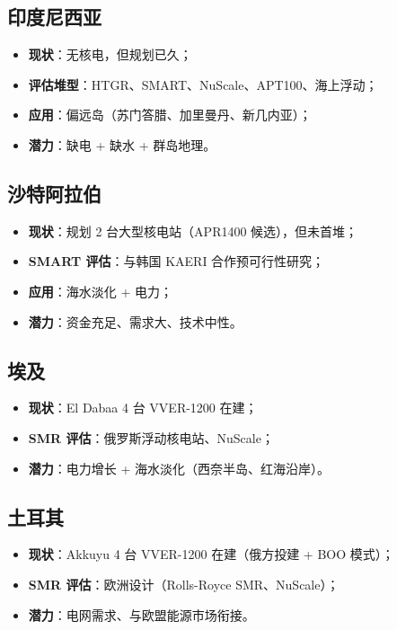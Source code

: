 \documentclass[
  UTF8,
  scheme=plain,
  fontsize=10pt,
  openany
]{ctexbook}
\begin{document}
\subsection{印度尼西亚}\label{ux5370ux5ea6ux5c3cux897fux4e9a}

\begin{itemize}
\tightlist
\item
  \textbf{现状}：无核电，但规划已久；
\item
  \textbf{评估堆型}：HTGR、SMART、NuScale、APT100、海上浮动；
\item
  \textbf{应用}：偏远岛（苏门答腊、加里曼丹、新几内亚）；
\item
  \textbf{潜力}：缺电 + 缺水 + 群岛地理。
\end{itemize}

\subsection{沙特阿拉伯}\label{ux6c99ux7279ux963fux62c9ux4f2f}

\begin{itemize}
\tightlist
\item
  \textbf{现状}：规划 2 台大型核电站（APR1400 候选），但未首堆；
\item
  \textbf{SMART 评估}：与韩国 KAERI 合作预可行性研究；
\item
  \textbf{应用}：海水淡化 + 电力；
\item
  \textbf{潜力}：资金充足、需求大、技术中性。
\end{itemize}

\subsection{埃及}\label{ux57c3ux53ca}

\begin{itemize}
\tightlist
\item
  \textbf{现状}：El Dabaa 4 台 VVER-1200 在建；
\item
  \textbf{SMR 评估}：俄罗斯浮动核电站、NuScale；
\item
  \textbf{潜力}：电力增长 + 海水淡化（西奈半岛、红海沿岸）。
\end{itemize}

\subsection{土耳其}\label{ux571fux8033ux5176}

\begin{itemize}
\tightlist
\item
  \textbf{现状}：Akkuyu 4 台 VVER-1200 在建（俄方投建 + BOO 模式）；
\item
  \textbf{SMR 评估}：欧洲设计（Rolls-Royce SMR、NuScale）；
\item
  \textbf{潜力}：电网需求、与欧盟能源市场衔接。
\end{itemize}
\end{document}
